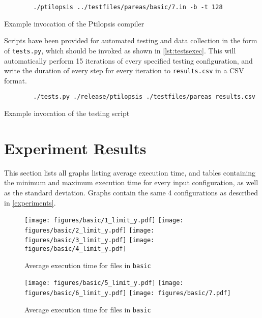 \documentclass[12pt,dvipsnames]{article}
\newcommand{\mono}[1]{\texttt{#1}}
\begin{document}
\begin{listing}[h]
    \begin{verbatim}
        ./ptilopsis ../testfiles/pareas/basic/7.in -b -t 128
    \end{verbatim}
    \caption{Example invocation of the Ptilopsis compiler}
    \label{lst:examplerun}
\end{listing}

Scripts have been provided for automated testing and data collection in the form of \mono{tests.py}, which should be invoked as shown in \autoref{lst:testsexec}. This will automatically perform 15 iterations of every specified testing configuration, and write the duration of every step for every iteration to \mono{results.csv} in a CSV format.

\begin{listing}[h]
    \begin{verbatim}
        ./tests.py ./release/ptilopsis ./testfiles/pareas results.csv
    \end{verbatim}
    \caption{Example invocation of the testing script}
    \label{lst:testsexec}
\end{listing}

\newpage
\section{Experiment Results} \label{results}
This section lists all graphs listing average execution time, and tables containing the minimum and maximum execution time for every input configuration, as well as the standard deviation. Graphs contain the same 4 configurations as described in \autoref{experiments}.

\begin{figure}[ht]
    \centering
    \texttt{[image: figures/basic/1\_limit\_y.pdf]}
    \texttt{[image: figures/basic/2\_limit\_y.pdf]}
    \texttt{[image: figures/basic/3\_limit\_y.pdf]}
    \texttt{[image: figures/basic/4\_limit\_y.pdf]}
    \caption{Average execution time for files in \mono{basic} }
    \label{fig:results_basic_a}
\end{figure}

\begin{figure}[ht]
    \centering
    \texttt{[image: figures/basic/5\_limit\_y.pdf]}
    \texttt{[image: figures/basic/6\_limit\_y.pdf]}
    \texttt{[image: figures/basic/7.pdf]}
    \caption{Average execution time for files in \mono{basic} }
    \label{fig:results_basic_b}
\end{figure}
\end{document}
